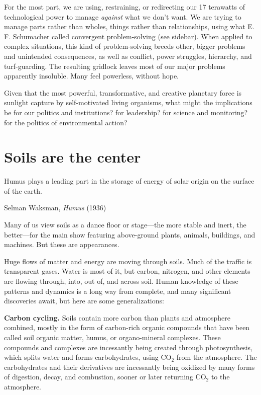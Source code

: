 \documentclass[11pt,letterpaper,twoside,onecolumn]{memoir}
\begin{document}
For the most part, we are using, restraining, or redirecting our 17 terawatts of technological power to manage \textit{against} what we don't want. We are trying to manage parts rather than wholes, things rather than relationships, using what E. F. Schumacher called convergent problem-solving (see sidebar). When applied to complex situations, this kind of problem-solving breeds other, bigger problems and unintended consequences, as well as conflict, power struggles, hierarchy, and turf-guarding. The resulting gridlock leaves most of our major problems apparently insoluble. Many feel powerless, without hope.

Given that the most powerful, transformative, and creative planetary force is sunlight capture by self-motivated living organisms, what might the implications be for our politics and institutions? for leadership? for science and monitoring? for the politics of environmental action?

\chapter{Soils are the center}

\epigraph{Humus plays a leading part in the storage of energy of solar origin on the surface of the earth.}{Selman Waksman, \textit{Humus} (1936)}

\noindent Many of us view soils as a dance floor or stage---the more stable and inert, the better---for the main show featuring above-ground plants, animals, buildings, and machines. But these are appearances. 

Huge flows of matter and energy are moving through soils. Much of the traffic is transparent gases. Water is most of it, but carbon, nitrogen, and other elements are flowing through, into, out of, and across soil. Human knowledge of these patterns and dynamics is a long way from complete, and many significant discoveries await, but here are some generalizations:

\textbf{Carbon cycling.} Soils contain more carbon than plants and atmosphere combined, mostly in the form of carbon-rich organic compounds that have been called soil organic matter, humus, or organo-mineral complexes. These compounds and complexes are incessantly being created through photosynthesis, which splits water and forms carbohydrates, using CO$_{2}$ from the atmosphere. The carbohydrates and their derivatives are incessantly being oxidized by many forms of digestion, decay, and combustion, sooner or later returning CO$_{2}$ to the atmosphere. 
\end{document}
